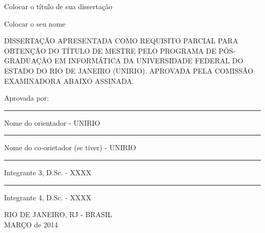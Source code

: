 \begin{center}
    Colocar o título de sua dissertação
    \vskip 1.5cm

    Colocar o seu nome
    \vskip 1.0cm

\end{center}
DISSERTAÇÃO APRESENTADA COMO REQUISITO PARCIAL PARA OBTENÇÃO DO TÍTULO DE MESTRE PELO PROGRAMA DE PÓS-GRADUAÇÃO EM INFORMÁTICA DA UNIVERSIDADE FEDERAL DO ESTADO DO RIO DE JANEIRO (UNIRIO). APROVADA PELA COMISSÃO EXAMINADORA ABAIXO ASSINADA.
\vskip 1.0cm

\begin{flushleft}
    Aprovada por:
    \vskip 1.0cm

\end{flushleft}
\begin{flushright}
    \rule{10.0cm}{.1mm}

    Nome do orientador - UNIRIO
    \vskip 1.0cm

    \rule{10.0cm}{.1mm}

    Nome do co-orietador (se tiver) - UNIRIO
    \vskip 1.0cm

    \rule{10.0cm}{.1mm}

    Integrante 3, D.Sc. - XXXX
    \vskip 1.0cm

    \rule{10.0cm}{.1mm}

    Integrante 4, D.Sc. - XXXX
\end{flushright}
\begin{center}
    RIO DE JANEIRO, RJ - BRASIL \\ MARÇO de 2014
\end{center}
